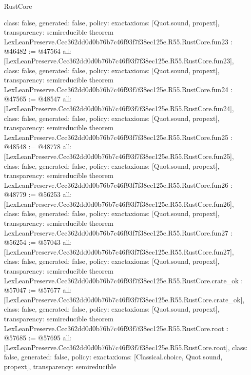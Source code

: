 \begin{lexlean}{RustCore}
\begin{coremodule}
{  class: false,
  generated: false,
  policy: exact{axioms: [Quot.sound, propext]},
  transparency: semireducible
}
theorem LexLeanPreserve.Ccc362dd0d0b76b7c46f93f7f38ec125e.R55.RustCore.fun23 : @46482 := @47564 {
  all: [LexLeanPreserve.Ccc362dd0d0b76b7c46f93f7f38ec125e.R55.RustCore.fun23],
  class: false,
  generated: false,
  policy: exact{axioms: [Quot.sound, propext]},
  transparency: semireducible
}
theorem LexLeanPreserve.Ccc362dd0d0b76b7c46f93f7f38ec125e.R55.RustCore.fun24 : @47565 := @48547 {
  all: [LexLeanPreserve.Ccc362dd0d0b76b7c46f93f7f38ec125e.R55.RustCore.fun24],
  class: false,
  generated: false,
  policy: exact{axioms: [Quot.sound, propext]},
  transparency: semireducible
}
theorem LexLeanPreserve.Ccc362dd0d0b76b7c46f93f7f38ec125e.R55.RustCore.fun25 : @48548 := @48778 {
  all: [LexLeanPreserve.Ccc362dd0d0b76b7c46f93f7f38ec125e.R55.RustCore.fun25],
  class: false,
  generated: false,
  policy: exact{axioms: [Quot.sound, propext]},
  transparency: semireducible
}
theorem LexLeanPreserve.Ccc362dd0d0b76b7c46f93f7f38ec125e.R55.RustCore.fun26 : @48779 := @56253 {
  all: [LexLeanPreserve.Ccc362dd0d0b76b7c46f93f7f38ec125e.R55.RustCore.fun26],
  class: false,
  generated: false,
  policy: exact{axioms: [Quot.sound, propext]},
  transparency: semireducible
}
theorem LexLeanPreserve.Ccc362dd0d0b76b7c46f93f7f38ec125e.R55.RustCore.fun27 : @56254 := @57043 {
  all: [LexLeanPreserve.Ccc362dd0d0b76b7c46f93f7f38ec125e.R55.RustCore.fun27],
  class: false,
  generated: false,
  policy: exact{axioms: [Quot.sound, propext]},
  transparency: semireducible
}
theorem LexLeanPreserve.Ccc362dd0d0b76b7c46f93f7f38ec125e.R55.RustCore.crate_ok : @57047 := @57677 {
  all: [LexLeanPreserve.Ccc362dd0d0b76b7c46f93f7f38ec125e.R55.RustCore.crate_ok],
  class: false,
  generated: false,
  policy: exact{axioms: [Quot.sound, propext]},
  transparency: semireducible
}
theorem LexLeanPreserve.Ccc362dd0d0b76b7c46f93f7f38ec125e.R55.RustCore.root : @57685 := @57695 {
  all: [LexLeanPreserve.Ccc362dd0d0b76b7c46f93f7f38ec125e.R55.RustCore.root],
  class: false,
  generated: false,
  policy: exact{axioms: [Classical.choice, Quot.sound, propext]},
  transparency: semireducible
}


\end{coremodule}
\end{lexlean}
